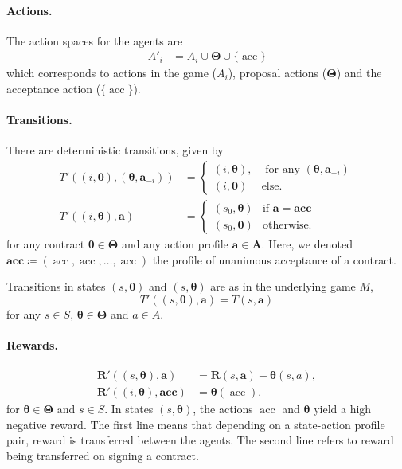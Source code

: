 \documentclass[referee,sn-basic]{sn-jnl}
\newcommand{\btheta}{\boldsymbol{\theta}}
\theoremstyle{thmstyleone}%
\theoremstyle{thmstyletwo}%
\theoremstyle{thmstylethree}%
\begin{document}
\paragraph{Actions.}
The action spaces for the agents are
\begin{align*}
A'_i &= A_i \cup \boldsymbol\Theta \cup \{\operatorname{acc}\}
\end{align*}
which corresponds to actions in the game ($A_i$), proposal actions ($\boldsymbol\Theta$) and the acceptance action ($\{\operatorname{acc}\}$). 
\paragraph{Transitions.}
There are deterministic transitions, given by
\begin{align*}
    T'((i, \boldsymbol 0), (\boldsymbol\theta, \mathbf a_{-i})) & = \begin{cases}
    (i, \boldsymbol\theta), & \text{ for any $(\btheta, \mathbf a_{-i})$}\\
    (i, \mathbf{0}) & \text{else.}\end{cases}\\
    T'((i, \boldsymbol\theta), \mathbf a) &=\begin{cases} (s_0, \boldsymbol\theta) & \text{if } \mathbf a = \textbf{acc} \\ (s_0, \boldsymbol 0) & \text{otherwise.} \end{cases}
\end{align*}
for any contract $\boldsymbol\theta \in \boldsymbol\Theta$ and any action profile $\mathbf a \in \mathbf A$. Here, we denoted $\textbf{acc} \coloneqq (\operatorname{acc}, \operatorname{acc}, \dots, \operatorname{acc})$ the profile of unanimous acceptance of a contract.

Transitions in states $(s, \boldsymbol 0)$ and $(s, \boldsymbol\theta)$ are as in the underlying game $M$,
\[
T'((s, \boldsymbol\theta), \mathbf a) = T(s, \mathbf a)
\]
for any $s\in S$, $\boldsymbol\theta \in \boldsymbol\Theta$ and $a \in A$. 
\paragraph{Rewards.}
\begin{equation*}
\begin{split}
\mathbf R'((s, \boldsymbol\theta), \mathbf a) &= \mathbf R(s,\mathbf a) + \boldsymbol\theta(s, a),\\
\mathbf R'((i, \boldsymbol\theta), \textbf{acc}) &= \boldsymbol \theta(\operatorname{acc}).
\end{split}
\end{equation*}
for $\boldsymbol\theta \in \boldsymbol\Theta $ and $s \in S$. In states $(s, \btheta)$, the actions $\operatorname{acc}$ and $\btheta$ yield a high negative reward. The first line means that depending on a state-action profile pair, reward is transferred between the agents. The second line refers to reward being transferred on signing a contract. 
\end{document}

